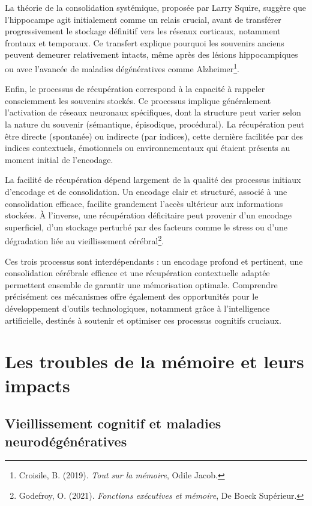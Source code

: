 \documentclass[12pt,a4paper]{report}
\begin{document}
La théorie de la consolidation systémique, proposée par Larry Squire, suggère que l'hippocampe agit initialement comme un relais crucial, avant de transférer progressivement le stockage définitif vers les réseaux corticaux, notamment frontaux et temporaux. Ce transfert explique pourquoi les souvenirs anciens peuvent demeurer relativement intacts, même après des lésions hippocampiques ou avec l’avancée de maladies dégénératives comme Alzheimer\footnote{Croisile, B. (2019). \textit{Tout sur la mémoire}, Odile Jacob.}.

Enfin, le processus de récupération correspond à la capacité à rappeler consciemment les souvenirs stockés. Ce processus implique généralement l'activation de réseaux neuronaux spécifiques, dont la structure peut varier selon la nature du souvenir (sémantique, épisodique, procédural). La récupération peut être directe (spontanée) ou indirecte (par indices), cette dernière facilitée par des indices contextuels, émotionnels ou environnementaux qui étaient présents au moment initial de l'encodage.

La facilité de récupération dépend largement de la qualité des processus initiaux d'encodage et de consolidation. Un encodage clair et structuré, associé à une consolidation efficace, facilite grandement l'accès ultérieur aux informations stockées. À l’inverse, une récupération déficitaire peut provenir d’un encodage superficiel, d’un stockage perturbé par des facteurs comme le stress ou d'une dégradation liée au vieillissement cérébral\footnote{Godefroy, O. (2021). \textit{Fonctions exécutives et mémoire}, De Boeck Supérieur.}.

Ces trois processus sont interdépendants : un encodage profond et pertinent, une consolidation cérébrale efficace et une récupération contextuelle adaptée permettent ensemble de garantir une mémorisation optimale. Comprendre précisément ces mécanismes offre également des opportunités pour le développement d'outils technologiques, notamment grâce à l’intelligence artificielle, destinés à soutenir et optimiser ces processus cognitifs cruciaux.

\section{Les troubles de la mémoire et leurs impacts}

\subsection{Vieillissement cognitif et maladies neurodégénératives}
\end{document}
